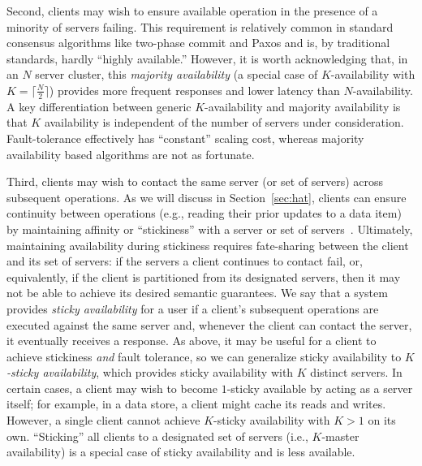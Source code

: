Second, clients may wish to ensure available operation in the presence
of a minority of servers failing. This requirement is relatively
common in standard consensus algorithms like two-phase commit and
Paxos and is, by traditional standards, hardly ``highly available.''
However, it is worth acknowledging that, in an $N$ server cluster,
this \textit{majority availability} (a special case of
$K$-availability with $K=\lceil \frac{N}{2} \rceil$) provides more
frequent responses and lower latency than $N$-availability. A key
differentiation between generic $K$-availability and majority
availability is that $K$ availability is independent of the number of
servers under consideration. Fault-tolerance effectively has
``constant'' scaling cost, whereas majority availability based
algorithms are not as fortunate.

Third, clients may wish to contact the same server (or set of servers)
across subsequent operations. As we will discuss in
Section~\ref{sec:hat}, clients can ensure continuity between
operations (e.g., reading their prior updates to a data item) by
maintaining affinity or ``stickiness'' with a server or set of
servers~\cite{vogels-defs}. Ultimately, maintaining availability
during stickiness requires fate-sharing between the client and its set
of servers: if the servers a client continues to contact fail, or,
equivalently, if the client is partitioned from its designated
servers, then it may not be able to achieve its desired semantic
guarantees. We say that a system provides \textit{sticky availability}
for a user if a client's subsequent operations are executed against
the same server and, whenever the client can contact the server, it
eventually receives a response. As above, it may be useful for a
client to achieve stickiness \textit{and} fault tolerance, so we can
generalize sticky availability to \textit{$K$-sticky availability},
which provides sticky availability with $K$ distinct servers. In
certain cases, a client may wish to become $1$-sticky available by
acting as a server itself; for example, in a data store, a client
might cache its reads and writes. However, a single client cannot
achieve $K$-sticky availability with $K>1$ on its own. ``Sticking''
all clients to a designated set of servers (i.e., $K$-master
availability) is a special case of sticky availability and is less
available.

